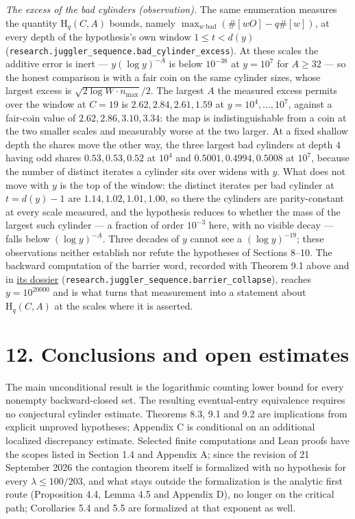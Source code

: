 \documentclass[11pt,a4paper]{article}
\begin{document}
\emph{The excess of the bad cylinders (observation).} The same
enumeration measures the quantity \(\mathrm H_q(C,A)\) bounds, namely
\(\max_{w\ \text{bad}}(\#[wO]-q\#[w])\), at every depth of the
hypothesis's own window \(1\le t<d(y)\)
(\texttt{\nolinkurl{research.juggler_sequence.bad_cylinder_excess}}). At
these scales the additive error is inert --- \(y(\log y)^{-A}\) is below
\(10^{-38}\) at \(y=10^7\) for \(A\ge32\) --- so the honest comparison
is with a fair coin on the same cylinder sizes, whose largest excess is
\(\sqrt{2\log W\cdot n_{\max}}/2\). The largest \(A\) the measured
excess permits over the window at \(C=19\) is \(2.62,2.84,2.61,1.59\) at
\(y=10^4,\dots,10^7\), against a fair-coin value of
\(2.62,2.86,3.10,3.34\): the map is indistinguishable from a coin at the
two smaller scales and measurably worse at the two larger. At a fixed
shallow depth the shares move the other way, the three largest bad
cylinders at depth \(4\) having odd shares \(0.53,0.53,0.52\) at
\(10^4\) and \(0.5001,0.4994,0.5008\) at \(10^7\), because the number of
distinct iterates a cylinder sits over widens with \(y\). What does not
move with \(y\) is the top of the window: the distinct iterates per bad
cylinder at \(t=d(y)-1\) are \(1.14,1.02,1.01,1.00\), so there the
cylinders are parity-constant at every scale measured, and the
hypothesis reduces to whether the mass of the largest such cylinder ---
a fraction of order \(10^{-3}\) here, with no visible decay --- falls
below \((\log y)^{-A}\). Three decades of \(y\) cannot see a
\((\log y)^{-19}\); these observations neither establish nor refute the
hypotheses of Sections 8--10. The backward computation of the barrier
word, recorded with Theorem 9.1 above and in
\href{https://github.com/sneakyweasel/btlab/blob/main/docs/problems/juggler_barrier_collapse.md}{its
dossier}
(\texttt{\nolinkurl{research.juggler_sequence.barrier_collapse}}),
reaches \(y=10^{20000}\) and is what turns that measurement into a
statement about \(\mathrm H_q(C,A)\) at the scales where it is asserted.

\section{12. Conclusions and open
estimates}\label{conclusions-and-open-estimates}

The main unconditional result is the logarithmic counting lower bound
for every nonempty backward-closed set. The resulting eventual-entry
equivalence requires no conjectural cylinder estimate. Theorems 8.3, 9.1
and 9.2 are implications from explicit unproved hypotheses; Appendix C
is conditional on an additional localized discrepancy estimate. Selected
finite computations and Lean proofs have the scopes listed in Section
1.4 and Appendix A; since the revision of 21 September 2026 the
contagion theorem itself is formalized with no hypothesis for every
\(\lambda\le100/203\), and what stays outside the formalization is the
analytic first route (Proposition 4.4, Lemma 4.5 and Appendix D), no
longer on the critical path; Corollaries 5.4 and 5.5 are formalized at
that exponent as well.
\end{document}
